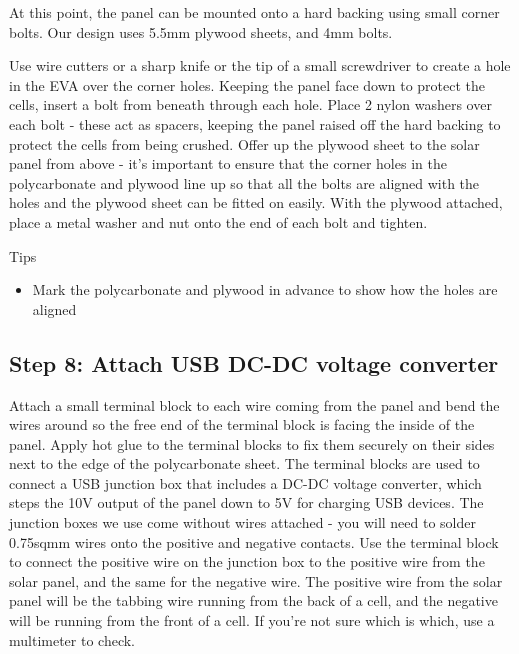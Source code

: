 \documentclass{article}
\theoremstyle{definition}
\theoremstyle{definition}
\theoremstyle{remark}
\begin{document}
    At this point, the panel can be mounted onto a hard backing using small corner bolts. Our design uses 5.5mm plywood sheets, and 4mm bolts. 

    Use wire cutters or a sharp knife or the tip of a small screwdriver to create a hole in the EVA over the corner holes. Keeping the panel face down to protect the cells, insert a bolt from beneath through each hole. Place 2 nylon washers over each bolt - these act as spacers, keeping the panel raised off the hard backing to protect the cells from being crushed. Offer up the plywood sheet to the solar panel from above - it’s important to ensure that the corner holes in the polycarbonate and plywood line up so that all the bolts are aligned with the holes and the plywood sheet can be fitted on easily. With the plywood attached, place a metal washer and nut onto the end of each bolt and tighten.

    Tips

    \begin{itemize}
      \item Mark the polycarbonate and plywood in advance to show how the holes are aligned
    \end{itemize}
  

  {\color{blue}\subsection{Step 8: Attach USB DC-DC voltage converter}} %
  \label{sub:step_8_attach_usb_dc_dc_voltage_converter}

    Attach a small terminal block to each wire coming from the panel and bend the wires around so the free end of the terminal block is facing the inside of the panel. Apply hot glue to the terminal blocks to fix them securely on their sides next to the edge of the polycarbonate sheet. The terminal blocks are used to connect a USB junction box that includes a DC-DC voltage converter, which steps the 10V output of the panel down to 5V for charging USB devices. The junction boxes we use come without wires attached - you will need to solder 0.75sqmm wires onto the positive and negative contacts. Use the terminal block to connect the positive wire on the junction box to the positive wire from the solar panel, and the same for the negative wire. The positive wire from the solar panel will be the tabbing wire running from the back of a cell, and the negative will be running from the front of a cell. If you’re not sure which is which, use a multimeter to check.
\end{document}
